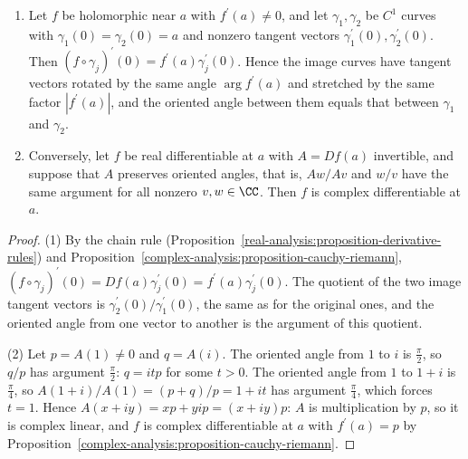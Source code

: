 \begin{proposition}\label{complex-analysis:proposition-conformal}
\begin{enumerate}
\item Let $f$ be holomorphic near $a$ with $f^{\prime}(a) \neq 0$, and let $\gamma_1, \gamma_2$ be $C^1$ curves with $\gamma_1(0) = \gamma_2(0) = a$ and nonzero tangent vectors $\gamma_1^{\prime}(0), \gamma_2^{\prime}(0)$.
Then $(f \circ \gamma_j)^{\prime}(0) = f^{\prime}(a)\gamma_j^{\prime}(0)$. Hence the image curves have tangent vectors rotated by the same angle $\arg f^{\prime}(a)$ and stretched by the same factor
$|f^{\prime}(a)|$, and the oriented angle between them equals that between $\gamma_1$ and $\gamma_2$.
\item Conversely, let $f$ be real differentiable at $a$ with $A = Df(a)$ invertible, and suppose that $A$ preserves oriented angles, that is, $Aw/Av$ and $w/v$ have the same argument for all nonzero
$v, w \in \CC$. Then $f$ is complex differentiable at $a$.
\end{enumerate}
\end{proposition}

\begin{proof}
(1) By the chain rule (Proposition~\ref{real-analysis:proposition-derivative-rules}) and Proposition~\ref{complex-analysis:proposition-cauchy-riemann},
$(f \circ \gamma_j)^{\prime}(0) = Df(a)\gamma_j^{\prime}(0) = f^{\prime}(a)\gamma_j^{\prime}(0)$. The quotient of the two image tangent vectors is $\gamma_2^{\prime}(0)/\gamma_1^{\prime}(0)$, the same as for the original
ones, and the oriented angle from one vector to another is the argument of this quotient.

(2) Let $p = A(1) \neq 0$ and $q = A(i)$. The oriented angle from $1$ to $i$ is $\frac\pi2$, so $q/p$ has argument $\frac\pi2$: $q = itp$ for some $t > 0$. The oriented angle from $1$ to $1 + i$ is $\frac\pi4$, so
$A(1 + i)/A(1) = (p + q)/p = 1 + it$ has argument $\frac\pi4$, which forces $t = 1$. Hence $A(x + iy) = xp + yip = (x + iy)p$: $A$ is multiplication by $p$, so it is complex linear, and $f$ is
complex differentiable at $a$ with $f^{\prime}(a) = p$ by Proposition~\ref{complex-analysis:proposition-cauchy-riemann}.
\end{proof}

